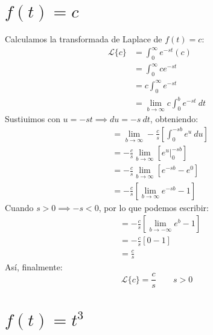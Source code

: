 \documentclass[12pt, a4paper]{article}
\begin{document}
\sffamily


\tableofcontents
\newpage

\setcounter{section}{1}
\section{\texorpdfstring{\(f(t) = c\)}{f (t) = c}}

Calculamos la transformada de Laplace de \(f(t) = c\):
\begin{align*}
    \mathcal{L}\{c\}&=\int_0^{\infty}e^{-st}(c)\\
    &=\int_0^{\infty}ce^{-st}\\
    &=c\int_0^{\infty}e^{-st}\\
    &=\lim_{b\to\infty}c\int_0^b e^{-st}\ dt
\end{align*}
Sustiuimos con \(u=-st \implies du =-s\ dt\), obteniendo:
\begin{align*}
	&=\lim_{b\to\infty}-\frac{c}{s}\left[\int_0^{-sb}  e^u\ du\right] \\
	&=-\frac{c}{s}\lim_{b\to\infty}\left[e^u\big|_0^{-sb}  \right]\\
	&=-\frac{c}{s}\lim_{b\to\infty}\left[e^{-sb}-e^{0}\right]\\
	&=-\frac{c}{s} \left[ \lim_{b\to\infty} e^{-sb} - 1 \right]
\end{align*}
Cuando \(s > 0 \implies -s < 0\), por lo que podemos escribir:
\begin{align*}
	&= -\frac{c}{s} \left[ \lim_{b\to-\infty} e^{b} - 1 \right] \\
	&= -\frac{c}{s} \left[ 0 - 1 \right] \\
	&= \frac{c}{s}
\end{align*}
Así, finalmente:
\[
\mathcal{L}\{c\}=\frac{c}{s} \qquad s > 0
\]

\setcounter{section}{4}
\section{\texorpdfstring{\(f(t) = t^3\)}{f (t) = t 3}}
\end{document}

